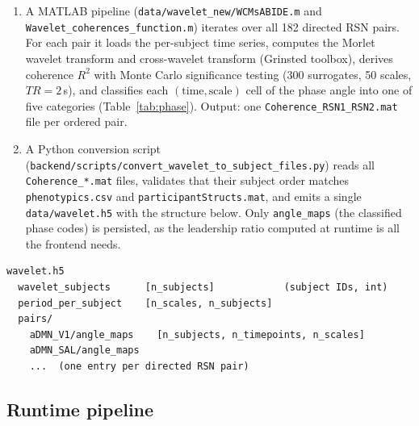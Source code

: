 \documentclass[11pt,a4paper]{article}
\begin{document}
\begin{enumerate}[leftmargin=*]
    \item A MATLAB pipeline (\texttt{data/wavelet\_new/WCMsABIDE.m}
    and \texttt{Wavelet\_coherences\_function.m}) iterates over all 182
    directed RSN pairs. For each pair it loads the per-subject time
    series, computes the Morlet wavelet transform and cross-wavelet
    transform (Grinsted toolbox), derives coherence $R^2$ with Monte
    Carlo significance testing (300 surrogates, 50 scales, $TR = 2$\,s),
    and classifies each $(\text{time}, \text{scale})$ cell of the phase
    angle into one of five categories (Table~\ref{tab:phase}). Output:
    one \texttt{Coherence\_RSN1\_RSN2.mat} file per ordered pair.

    \item A Python conversion script
    (\texttt{backend/scripts/con\-vert\_wavelet\_to\_subject\_files.py})
    reads all \texttt{Coherence\_*.mat} files, validates that their
    subject order matches \texttt{phenotypics.csv} and
    \texttt{participantStructs.mat}, and emits a single
    \texttt{data/wavelet.h5} with the structure below. Only
    \texttt{angle\_maps} (the classified phase codes) is persisted, as
    the leadership ratio computed at runtime is all the frontend needs.
\end{enumerate}

\begin{verbatim}
wavelet.h5
  wavelet_subjects      [n_subjects]            (subject IDs, int)
  period_per_subject    [n_scales, n_subjects]
  pairs/
    aDMN_V1/angle_maps    [n_subjects, n_timepoints, n_scales]
    aDMN_SAL/angle_maps
    ...  (one entry per directed RSN pair)
\end{verbatim}

\subsection{Runtime pipeline}
\end{document}
